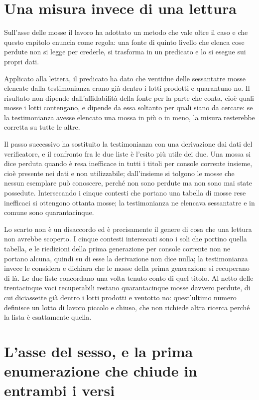 \section{Una misura invece di una lettura}

Sull'asse delle mosse il lavoro ha adottato un metodo che vale oltre il caso e che questo capitolo enuncia come regola: una fonte di quinto livello che elenca cose perdute non si legge per crederle, si trasforma in un predicato e lo si esegue sui propri dati.

Applicato alla lettera, il predicato ha dato che ventidue delle sessantatre mosse elencate dalla testimonianza erano già dentro i lotti prodotti e quarantuno no. Il risultato non dipende dall'affidabilità della fonte per la parte che conta, cioè quali mosse i lotti contengano, e dipende da essa soltanto per quali siano da cercare: se la testimonianza avesse elencato una mossa in più o in meno, la misura resterebbe corretta su tutte le altre.

Il passo successivo ha sostituito la testimonianza con una derivazione dai dati del verificatore, e il confronto fra le due liste è l'esito più utile dei due. Una mossa si dice perduta quando è resa inefficace in tutti i titoli per console corrente insieme, cioè presente nei dati e non utilizzabile; dall'insieme si tolgono le mosse che nessun esemplare può conoscere, perché non sono perdute ma non sono mai state possedute. Intersecando i cinque contesti che portano una tabella di mosse rese inefficaci si ottengono ottanta mosse; la testimonianza ne elencava sessantatre e in comune sono quarantacinque.

Lo scarto non è un disaccordo ed è precisamente il genere di cosa che una lettura non avrebbe scoperto. I cinque contesti intersecati sono i soli che portino quella tabella, e le riedizioni della prima generazione per console corrente non ne portano alcuna, quindi su di esse la derivazione non dice nulla; la testimonianza invece le considera e dichiara che le mosse della prima generazione si recuperano di là. Le due liste concordano una volta tenuto conto di quel titolo. Al netto delle trentacinque voci recuperabili restano quarantacinque mosse davvero perdute, di cui diciassette già dentro i lotti prodotti e ventotto no: quest'ultimo numero definisce un lotto di lavoro piccolo e chiuso, che non richiede altra ricerca perché la lista è esattamente quella.

\section{L'asse del sesso, e la prima enumerazione che chiude in entrambi i versi}

